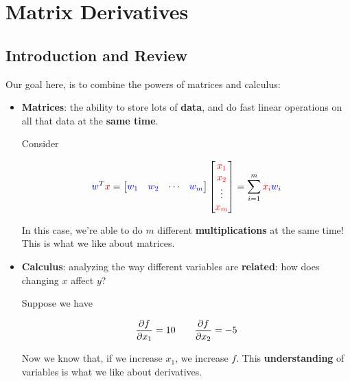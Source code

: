 

\chapter{Matrix Derivatives}
\section{Introduction and Review}

    
        
    Our goal here, is to combine the powers of matrices and calculus:
    
    \begin{itemize}
        \item \textbf{Matrices}: the ability to store lots of \textbf{data}, and do fast linear operations on all that data at the \textbf{same time}.
        
        \miniex Consider
        
        \begin{equation}
            \textcolor{blue}{w}^T\textcolor{red}{x} =
            \begin{bmatrix}
                \textcolor{blue}{w_1} & \textcolor{blue}{w_2} & \cdots & \textcolor{blue}{w_m}
            \end{bmatrix}
            \begin{bmatrix}
                \textcolor{red}{x_1} \\ \textcolor{red}{x_2} \\ \vdots \\ \textcolor{red}{x_m}
            \end{bmatrix}
            =
            \sum_{i=1}^m \textcolor{red}{x_i}\textcolor{blue}{w_i}
        \end{equation}
        
        In this case, we're able to do $m$ different \textbf{multiplications} at the same time! This is what we like about matrices.
        
        \item \textbf{Calculus}: analyzing the way different variables are \textbf{related}: how does changing $x$ affect $y$?
        
        \miniex Suppose we have 
        
        \begin{equation}
            \frac{\partial f}{\partial x_1}=10 \qquad 
            \frac{\partial f}{\partial x_2}=-5
        \end{equation}
        
        Now we know that, if we increase $x_1$, we increase $f$. This \textbf{understanding} of variables is what we like about derivatives.\\
    \end{itemize}
    
